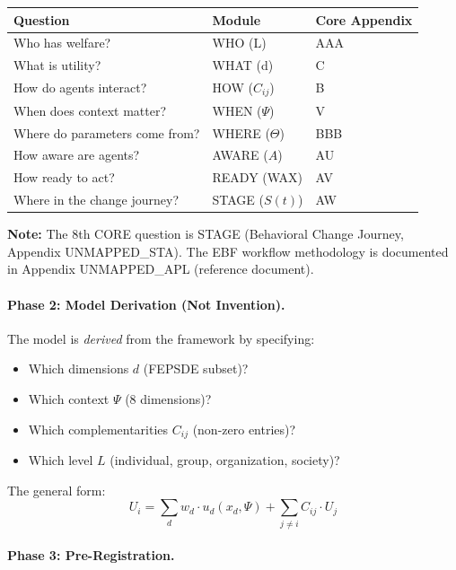 \begin{center}
\small
\begin{tabular}{@{}lll@{}}
\toprule
\textbf{Question} & \textbf{Module} & \textbf{Core Appendix} \\
\midrule
Who has welfare? & WHO (L) & AAA \\
What is utility? & WHAT (d) & C \\
How do agents interact? & HOW ($C_{ij}$) & B \\
When does context matter? & WHEN ($\Psi$) & V \\
Where do parameters come from? & WHERE ($\Theta$) & BBB \\
How aware are agents? & AWARE ($A$) & AU \\
How ready to act? & READY (WAX) & AV \\
Where in the change journey? & STAGE ($S(t)$) & AW \\
\bottomrule
\end{tabular}
\end{center}

\textbf{Note:} The 8th CORE question is STAGE (Behavioral Change Journey, Appendix UNMAPPED_STA).
The EBF workflow methodology is documented in Appendix UNMAPPED_APL (reference document).

\paragraph{Phase 2: Model Derivation (Not Invention).}

The model is \textit{derived} from the framework by specifying:
\begin{itemize}[nosep]
    \item Which dimensions $d$ (FEPSDE subset)?
    \item Which context $\Psi$ (8 dimensions)?
    \item Which complementarities $C_{ij}$ (non-zero entries)?
    \item Which level $L$ (individual, group, organization, society)?
\end{itemize}

The general form:
\begin{equation}
U_i = \sum_d w_d \cdot u_d(x_d, \Psi) + \sum_{j \neq i} C_{ij} \cdot U_j
\end{equation}

\paragraph{Phase 3: Pre-Registration.}


